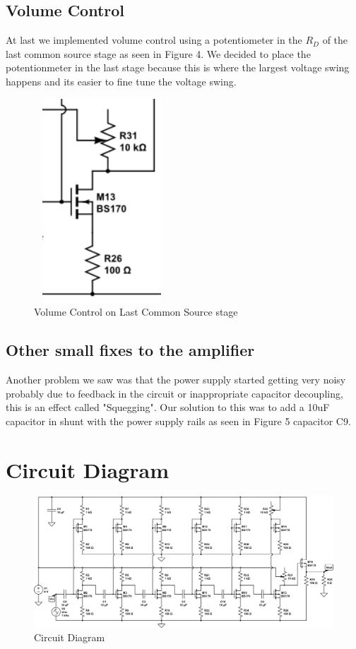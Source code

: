 \documentclass[11pt, twoside, letterpaper]{article}
\begin{document}
\subsection{Volume Control}
At last we implemented volume control using a potentiometer in the $R_D$ of the last common source stage as seen in Figure 4. We decided
to place the potentionmeter in the last stage because this is where the largest voltage swing happens and its easier to fine tune the 
voltage swing.

\begin{figure}[htbp]
\begin{center}
\includegraphics[width=2in,height=3in]{VolumeControl.png}
\caption{Volume Control on Last Common Source stage}
\end{center}
\end{figure}
\FloatBarrier

\subsection{Other small fixes to the amplifier}
Another problem we saw was that the power supply started getting very noisy probably due to feedback in the circuit or inappropriate capacitor
decoupling, this is an effect called "Squegging". Our solution to this was to add a 10uF capacitor in shunt with the power supply rails as 
seen in Figure 5 capacitor C9.
\newpage 

\section{Circuit Diagram}
\begin{figure}[htbp]
	\begin{center}
		\includegraphics[scale=0.80,angle=-90]{circuitdiagram.png}
		\caption{Circuit Diagram}
	\end{center}
\end{figure}
\FloatBarrier
\newpage
\end{document}
